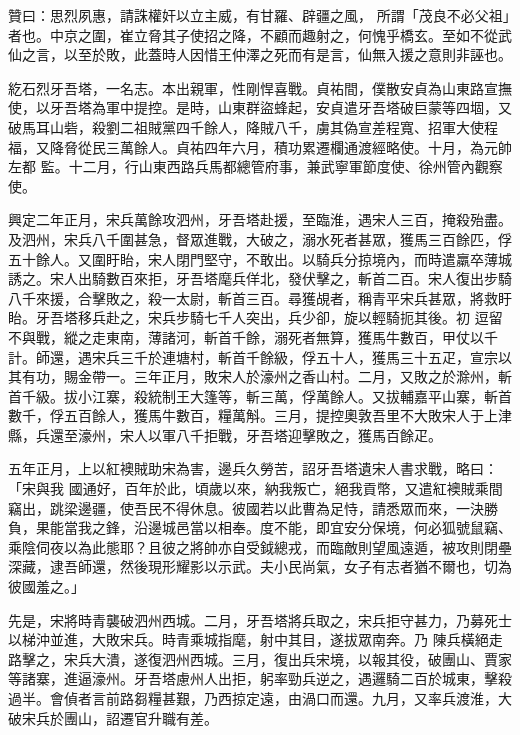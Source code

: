 \begin{pinyinscope}
 贊曰：思烈夙惠，請誅權奸以立主威，有甘羅、辟疆之風，
 所謂「茂良不必父祖」者也。中京之圍，崔立脅其子使招之降，不顧而趣射之，何愧乎橋玄。至如不從武仙之言，以至於敗，此蓋時人因惜王仲澤之死而有是言，仙無入援之意則非誣也。



 紇石烈牙吾塔，一名志。本出親軍，性剛悍喜戰。貞祐間，僕散安貞為山東路宣撫使，以牙吾塔為軍中提控。是時，山東群盜蜂起，安貞遣牙吾塔破巨蒙等四堌，又破馬耳山砦，殺劉二祖賊黨四千餘人，降賊八千，虜其偽宣差程寬、招軍大使程福，又降脅從民三萬餘人。貞祐四年六月，積功累遷欄通渡經略使。十月，為元帥左都
 監。十二月，行山東西路兵馬都總管府事，兼武寧軍節度使、徐州管內觀察使。



 興定二年正月，宋兵萬餘攻泗州，牙吾塔赴援，至臨淮，遇宋人三百，掩殺殆盡。及泗州，宋兵八千圍甚急，督眾進戰，大破之，溺水死者甚眾，獲馬三百餘匹，俘五十餘人。又圍盱眙，宋人閉門堅守，不敢出。以騎兵分掠境內，而時遣羸卒薄城誘之。宋人出騎數百來拒，牙吾塔麾兵佯北，發伏擊之，斬首二百。宋人復出步騎八千來援，合擊敗之，殺一太尉，斬首三百。尋獲覘者，稱青平宋兵甚眾，將救盱眙。牙吾塔移兵赴之，宋兵步騎七千人突出，兵少卻，旋以輕騎扼其後。初
 逗留不與戰，縱之走東南，薄諸河，斬首千餘，溺死者無算，獲馬牛數百，甲仗以千計。師還，遇宋兵三千於連塘村，斬首千餘級，俘五十人，獲馬三十五疋，宣宗以其有功，賜金帶一。三年正月，敗宋人於濠州之香山村。二月，又敗之於滁州，斬首千級。拔小江寨，殺統制王大篷等，斬三萬，俘萬餘人。又拔輔嘉平山寨，斬首數千，俘五百餘人，獲馬牛數百，糧萬斛。三月，提控奧敦吾里不大敗宋人于上津縣，兵還至濠州，宋人以軍八千拒戰，牙吾塔迎擊敗之，獲馬百餘疋。



 五年正月，上以紅襖賊助宋為害，邊兵久勞苦，詔牙吾塔遺宋人書求戰，略曰：「宋與我
 國通好，百年於此，頃歲以來，納我叛亡，絕我貢幣，又遣紅襖賊乘間竊出，跳梁邊疆，使吾民不得休息。彼國若以此曹為足恃，請悉眾而來，一決勝負，果能當我之鋒，沿邊城邑當以相奉。度不能，即宜安分保境，何必狐號鼠竊、乘陰伺夜以為此態耶？且彼之將帥亦自受鉞總戎，而臨敵則望風遠遁，被攻則閉壘深藏，逮吾師還，然後現形耀影以示武。夫小民尚氣，女子有志者猶不爾也，切為彼國羞之。」



 先是，宋將時青襲破泗州西城。二月，牙吾塔將兵取之，宋兵拒守甚力，乃募死士以梯沖並進，大敗宋兵。時青乘城指麾，射中其目，遂拔眾南奔。乃
 陳兵橫絕走路擊之，宋兵大潰，遂復泗州西城。三月，復出兵宋境，以報其役，破團山、賈家等諸寨，進逼濠州。牙吾塔慮州人出拒，躬率勁兵逆之，遇邏騎二百於城東，擊殺過半。會偵者言前路芻糧甚艱，乃西掠定遠，由渦口而還。九月，又率兵渡淮，大破宋兵於團山，詔遷官升職有差。




\end{pinyinscope}
